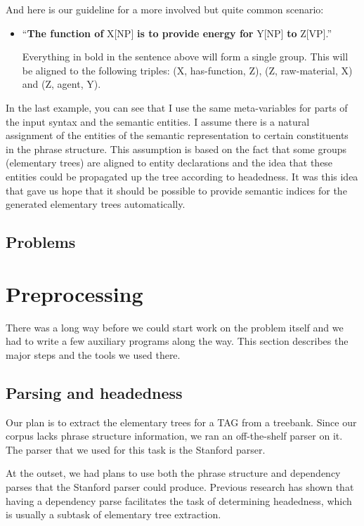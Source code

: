 \documentclass[a4paper]{article}
\begin{document}
And here is our guideline for a more involved but quite common
scenario:

\begin{itemize}
\item ``\textbf{The function of} X[NP] \textbf{is to provide energy
  for} Y[NP] \textbf{to} Z[VP].''

  Everything in bold in the sentence above will form a single group.
  This will be aligned to the following triples: (X, has-function, Z),
  (Z, raw-material, X) and (Z, agent, Y).
\end{itemize}

In the last example, you can see that I use the same meta-variables
for parts of the input syntax and the semantic entities. I assume
there is a natural assignment of the entities of the semantic
representation to certain constituents in the phrase structure. This
assumption is based on the fact that some groups (elementary trees)
are aligned to entity declarations and the idea that these entities
could be propagated up the tree according to headedness. It was this
idea that gave us hope that it should be possible to provide semantic
indices for the generated elementary trees automatically.

\subsection{Problems}



\section{Preprocessing}

There was a long way before we could start work on the problem itself
and we had to write a few auxiliary programs along the way. This
section describes the major steps and the tools we used there.

\subsection{Parsing and headedness}

Our plan is to extract the elementary trees for a TAG from a treebank.
Since our corpus lacks phrase structure information, we ran an
off-the-shelf parser on it. The parser that we used for this task is
the Stanford parser.

At the outset, we had plans to use both the phrase structure and
dependency parses that the Stanford parser could produce. Previous
research has shown that having a dependency parse facilitates the task
of determining headedness, which is usually a subtask of elementary
tree extraction.
\end{document}
